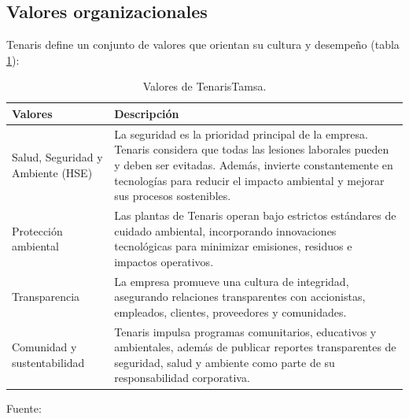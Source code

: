 \subsection{Valores organizacionales}

Tenaris define un conjunto de valores que orientan su cultura y desempeño (tabla \ref{tab:valores}):

\begin{table}[H]
    \centering
    \caption{Valores de TenarisTamsa.}
    \label{tab:valores}
    \begin{tabularx}{\textwidth}{|X|X|}
        \hline
        Valores                           & Descripción                                                                                                                                                                                                                                                \\ \hline
        Salud, Seguridad y Ambiente (HSE) & La seguridad es la prioridad principal de la empresa. Tenaris considera que todas las lesiones laborales pueden y deben ser evitadas. Además, invierte constantemente en tecnologías para reducir el impacto ambiental y mejorar sus procesos sostenibles. \\ \hline
        Protección ambiental              & Las plantas de Tenaris operan bajo estrictos estándares de cuidado ambiental, incorporando innovaciones tecnológicas para minimizar emisiones, residuos e impactos operativos.                                                                             \\ \hline
        Transparencia                     & La empresa promueve una cultura de integridad, asegurando relaciones transparentes con accionistas, empleados, clientes, proveedores y comunidades.                                                                                                        \\ \hline
        Comunidad y sustentabilidad       & Tenaris impulsa programas comunitarios, educativos y ambientales, además de publicar reportes transparentes de seguridad, salud y ambiente como parte de su responsabilidad corporativa.                                                                   \\ \hline
    \end{tabularx}
\end{table}

Fuente: \parencite{Tenaris}